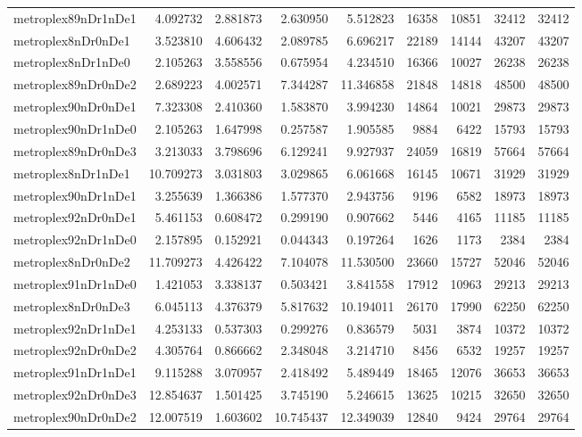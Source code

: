 \begin{longtable}{|l|r|r|r|r|r|r|r|r|}
metroplex89nDr1nDe1 & 4.092732 & 2.881873 & 2.630950 & 5.512823 & 16358 & 10851 & 32412 & 32412 \\
metroplex8nDr0nDe1 & 3.523810 & 4.606432 & 2.089785 & 6.696217 & 22189 & 14144 & 43207 & 43207 \\
metroplex8nDr1nDe0 & 2.105263 & 3.558556 & 0.675954 & 4.234510 & 16366 & 10027 & 26238 & 26238 \\
metroplex89nDr0nDe2 & 2.689223 & 4.002571 & 7.344287 & 11.346858 & 21848 & 14818 & 48500 & 48500 \\
metroplex90nDr0nDe1 & 7.323308 & 2.410360 & 1.583870 & 3.994230 & 14864 & 10021 & 29873 & 29873 \\
metroplex90nDr1nDe0 & 2.105263 & 1.647998 & 0.257587 & 1.905585 & 9884 & 6422 & 15793 & 15793 \\
metroplex89nDr0nDe3 & 3.213033 & 3.798696 & 6.129241 & 9.927937 & 24059 & 16819 & 57664 & 57664 \\
metroplex8nDr1nDe1 & 10.709273 & 3.031803 & 3.029865 & 6.061668 & 16145 & 10671 & 31929 & 31929 \\
metroplex90nDr1nDe1 & 3.255639 & 1.366386 & 1.577370 & 2.943756 & 9196 & 6582 & 18973 & 18973 \\
metroplex92nDr0nDe1 & 5.461153 & 0.608472 & 0.299190 & 0.907662 & 5446 & 4165 & 11185 & 11185 \\
metroplex92nDr1nDe0 & 2.157895 & 0.152921 & 0.044343 & 0.197264 & 1626 & 1173 & 2384 & 2384 \\
metroplex8nDr0nDe2 & 11.709273 & 4.426422 & 7.104078 & 11.530500 & 23660 & 15727 & 52046 & 52046 \\
metroplex91nDr1nDe0 & 1.421053 & 3.338137 & 0.503421 & 3.841558 & 17912 & 10963 & 29213 & 29213 \\
metroplex8nDr0nDe3 & 6.045113 & 4.376379 & 5.817632 & 10.194011 & 26170 & 17990 & 62250 & 62250 \\
metroplex92nDr1nDe1 & 4.253133 & 0.537303 & 0.299276 & 0.836579 & 5031 & 3874 & 10372 & 10372 \\
metroplex92nDr0nDe2 & 4.305764 & 0.866662 & 2.348048 & 3.214710 & 8456 & 6532 & 19257 & 19257 \\
metroplex91nDr1nDe1 & 9.115288 & 3.070957 & 2.418492 & 5.489449 & 18465 & 12076 & 36653 & 36653 \\
metroplex92nDr0nDe3 & 12.854637 & 1.501425 & 3.745190 & 5.246615 & 13625 & 10215 & 32650 & 32650 \\
metroplex90nDr0nDe2 & 12.007519 & 1.603602 & 10.745437 & 12.349039 & 12840 & 9424 & 29764 & 29764 \\

\end{longtable}
